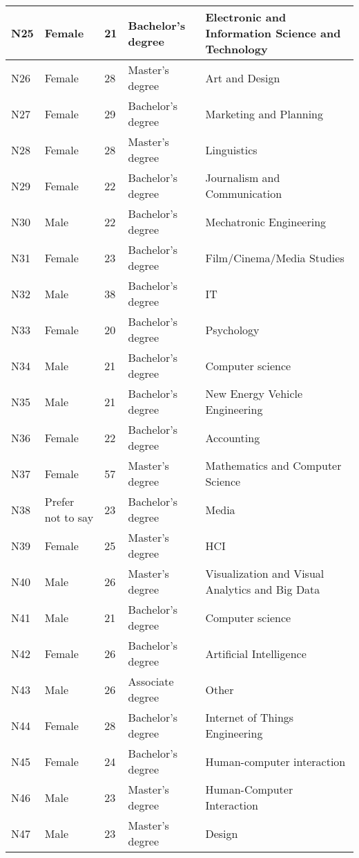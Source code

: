 \begin{longtable}{|p{1cm}|p{1.5cm}|p{0.8cm}|p{4cm}|p{4cm}|}
N25 & Female & 21 & Bachelor's degree & Electronic and Information Science and Technology \\ \hline
N26 & Female & 28 & Master’s degree & Art and Design \\ \hline
N27 & Female & 29 & Bachelor's degree & Marketing and Planning \\ \hline
N28 & Female & 28 & Master’s degree & Linguistics \\ \hline
N29 & Female & 22 & Bachelor's degree & Journalism and Communication \\ \hline
N30 & Male   & 22 & Bachelor's degree & Mechatronic Engineering \\ \hline
N31 & Female & 23 & Bachelor's degree & Film/Cinema/Media Studies\\ \hline
N32 & Male   & 38 & Bachelor’s degree & IT \\ \hline
N33 & Female   & 20 & Bachelor's degree & Psychology \\ \hline
N34 & Male   & 21 & Bachelor’s degree   & Computer science \\ \hline
N35 & Male   & 21 & Bachelor's degree & New Energy Vehicle Engineering \\ \hline
N36 & Female   & 22 & Bachelor's degree & Accounting \\ \hline
N37 & Female & 57 & Master's degree   & Mathematics and Computer Science \\ \hline
N38 & Prefer not to say & 23 & Bachelor's degree & Media \\ \hline
N39 & Female & 25 & Master’s degree & HCI \\ \hline
N40 & Male & 26 & Master’s degree & Visualization and Visual Analytics and Big Data \\ \hline
N41 & Male   & 21 & Bachelor’s degree   & Computer science \\ \hline
N42 & Female   & 26 & Bachelor’s degree   & Artificial Intelligence \\ \hline
N43 & Male & 26 & Associate degree    & Other \\ \hline
N44 & Female & 28 & Bachelor’s degree   & Internet of Things Engineering \\ \hline
N45 & Female & 24 & Bachelor’s degree   & Human-computer interaction \\ \hline
N46 & Male   & 23 & Master's degree   & Human-Computer Interaction \\ \hline
N47 & Male & 23 & Master's degree   & Design \\ 

\end{longtable}

